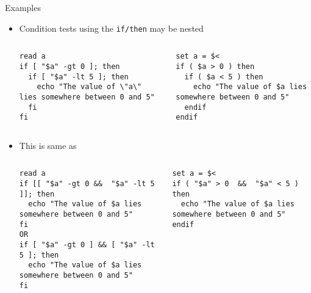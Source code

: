 \documentclass[slidestop,mathserif,compress,xcolor=svgnames]{beamer}
\newenvironment{bblock}[0]
{
\begin{beamerboxesrounded}[upper=uppercol1,lower=lowercol1,shadow=true]}
{\end{beamerboxesrounded}}
\newenvironment{eblock}[0]
{
\begin{beamerboxesrounded}[upper=uppercol2,lower=lowercol2,shadow=true]}
{\end{beamerboxesrounded}}
\begin{document}
\begin{frame}[fragile]{\small Examples}
  \begin{itemize}
    \item Condition tests using the \texttt{if/then} may be nested
    {\fontsize{4.5}{5.5}\selectfont
      \begin{columns}
        \begin{eblock}{}
      \begin{verbatim}
read a
if [ "$a" -gt 0 ]; then
  if [ "$a" -lt 5 ]; then
    echo "The value of \"a\" lies somewhere between 0 and 5"
  fi
fi
      \end{verbatim}
        \end{eblock}
        \begin{bblock}{}
      \begin{verbatim}
set a = $<
if ( $a > 0 ) then
  if ( $a < 5 ) then
    echo "The value of $a lies somewhere between 0 and 5"
  endif
endif
      \end{verbatim}
        \end{bblock}
      \end{columns}
    }
    \item This is same as 
    {\fontsize{4.5}{5.5}\selectfont
      \begin{columns}
        \begin{eblock}{}
      \begin{verbatim}
read a
if [[ "$a" -gt 0 &&  "$a" -lt 5 ]]; then
  echo "The value of $a lies somewhere between 0 and 5"
fi
OR
if [ "$a" -gt 0 ] && [ "$a" -lt 5 ]; then
  echo "The value of $a lies somewhere between 0 and 5"
fi
      \end{verbatim}
        \end{eblock}
        \begin{bblock}{}
      \begin{verbatim}
set a = $<
if ( "$a" > 0  &&  "$a" < 5 ) then
  echo "The value of $a lies somewhere between 0 and 5"
endif
      \end{verbatim}
        \end{bblock}
      \end{columns}
    }
  \end{itemize}
\end{frame}
\end{document}
